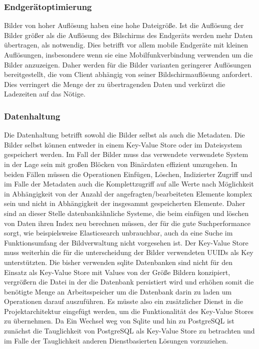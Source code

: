 \subsubsection{Endgerätoptimierung}

Bilder von hoher Auflösung haben eine hohe Dateigröße. Ist die Auflösung der
Bilder größer als die Auflösung des Bilschirms des Endgeräts werden mehr Daten
übertragen, als notwendig. Dies betrifft vor allem mobile Endgeräte mit
kleinen Auflösungen, insbesondere wenn sie eine Mobilfunkverbindung verwenden um
die Bilder anzuzeigen. Daher werden für die Bilder varianten geringerer
Auflösungen bereitgestellt, die vom Client abhängig von seiner
Bildschirmauflösung anfordert. Dies verringert die Menge der zu übertragenden
Daten und verkürzt die Ladezeiten auf das Nötige.

\subsubsection{Datenhaltung}

Die Datenhaltung betrifft sowohl die Bilder selbst als auch die Metadaten. Die
Bilder selbst können entweder in einem Key-Value Store oder im Dateisystem
gespeichert werden. Im Fall der Bilder muss das verwendete verwendete System in
der Lage sein mit großen Blöcken von Binärdaten effizient umzugehen. In
beiden Fällen müssen die Operationen Einfügen, Löschen, Indizierter Zugriff und
im Falle der Metadaten auch die Komplettzugriff auf alle Werte nach Möglichkeit
in Abhängigkeit von der Anzahl der angefragten/bearbeiteten Elemente komplex
sein und nicht in Abhängigkeit der insgesammt gespeicherten Elemente. Daher sind
an dieser Stelle datenbankähnliche Systeme, die beim einfügen und löschen von
Daten ihren Index neu berechnen müssen, der für die gute Suchperformance sorgt,
wie beispielsweise Elasticsearch unbrauchbar, auch da eine Suche im
Funktionsumfang der Bildverwaltung nicht vorgesehen ist. Der Key-Value Store
muss weiterhin die für die unterscheidung der Bilder verwendeten UUIDs als Key
unterstützten. Die bisher verwenden sqlite Datenbanken sind nicht für den
Einsatz als Key-Value Store mit Values von der Größe Bildern konzipiert,
vergrößern die Datei in der die Datenbank persistiert wird und erhöhen somit die
benötigte Menge an Arbeitsspeicher um die Datenbank darin zu laden um
Operationen darauf auszuführen. Es müsste also ein zusätzlicher Dienst in die
Projektarchitektur eingefügt werden, um die Funktionalität des Key-Value Stores
zu übernehmen. Da Ein Wechsel weg von Sqlite und hin zu PostgreSQL ist zunächst
die Tauglichkeit von PostgreSQL als Key-Value Store zu betrachten und im Falle
der Tauglichkeit anderen Dienstbasierten Lösungen vorzuziehen.


